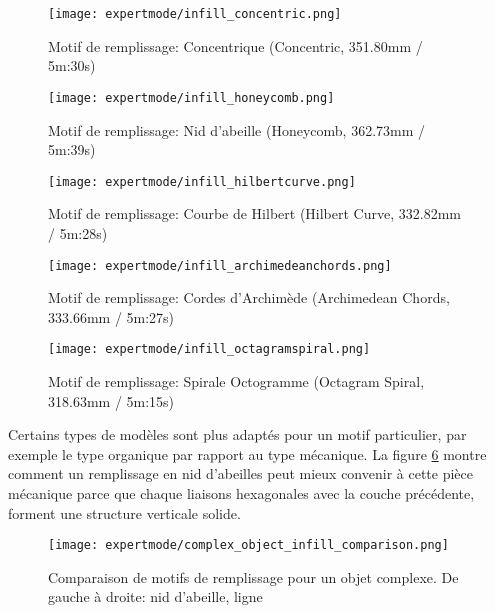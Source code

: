 \begin{figure}[H]
\centering
\texttt{[image: expertmode/infill\_concentric.png]}
\caption{Motif de remplissage: Concentrique (Concentric, 351.80mm / 5m:30s)}
\label{fig:infill_concentric}
\end{figure}

\begin{figure}[H]
\centering
\texttt{[image: expertmode/infill\_honeycomb.png]}
\caption{Motif de remplissage: Nid d'abeille (Honeycomb, 362.73mm / 5m:39s)}
\label{fig:infill_honeycomb}
\end{figure}

\begin{figure}[H]
\centering
\texttt{[image: expertmode/infill\_hilbertcurve.png]}
\caption{Motif de remplissage: Courbe de Hilbert (Hilbert Curve, 332.82mm / 5m:28s)}
\label{fig:infill_hilbertcurve}
\end{figure}

\begin{figure}[H]
\centering
\texttt{[image: expertmode/infill\_archimedeanchords.png]}
\caption{Motif de remplissage: Cordes d'Archim\`ede (Archimedean Chords, 333.66mm / 5m:27s)}
\label{fig:infill_archimedeanchords}
\end{figure}

\begin{figure}[H]
\centering
\texttt{[image: expertmode/infill\_octagramspiral.png]}
\caption{Motif de remplissage: Spirale Octogramme (Octagram Spiral, 318.63mm / 5m:15s)}
\label{fig:infill_octagramspiral}
\end{figure}


Certains types de mod\`eles sont plus adapt\'es pour un motif particulier, par exemple le type organique par rapport au type m\'ecanique.  La figure \ref{fig:complex_object_infill_comparison} montre comment un remplissage en nid d'abeilles peut mieux convenir \`a cette pi\`ece m\'ecanique parce que chaque liaisons hexagonales avec la couche pr\'ec\'edente, forment une structure verticale solide.

\begin{figure}[H]
\centering
\texttt{[image: expertmode/complex\_object\_infill\_comparison.png]}
\caption{Comparaison de motifs de remplissage pour un objet complexe. De gauche \`a droite: nid d'abeille, ligne}
\label{fig:complex_object_infill_comparison}
\end{figure}


